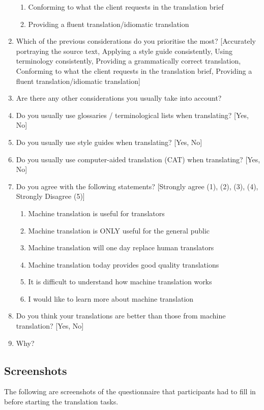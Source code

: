\begin{enumerate}
\begin{enumerate}
\item Conforming to what the client requests in the translation brief
\item Providing a fluent translation/idiomatic translation
\end{enumerate}
\item Which of the previous considerations do you prioritise the most? [Accurately portraying the source text, Applying a style guide consistently, Using terminology consistently, Providing a grammatically correct translation, Conforming to what the client requests in the translation brief, Providing a fluent translation/idiomatic translation]
\item Are there any other considerations you usually take into account?
\item Do you usually use glossaries / terminological lists when translating? [Yes, No]
\item Do you usually use style guides when translating? [Yes, No]
\item Do you usually use computer-aided translation (CAT) when translating? [Yes, No]
\item Do you agree with the following statements? [Strongly agree (1), (2), (3), (4), Strongly Disagree (5)]
\begin{enumerate}
\item Machine translation is useful for translators
\item Machine translation is ONLY useful for the general public
\item Machine translation will one day replace human translators
\item Machine translation today provides good quality translations
\item It is difficult to understand how machine translation works
\item I would like to learn more about machine translation
\end{enumerate}
\item Do you think your translations are better than those from machine translation? [Yes, No]
\item Why?
\end{enumerate}

\subsection{Screenshots}

\noindent The following are screenshots of the questionnaire that participants had to fill in before starting the translation tasks.

